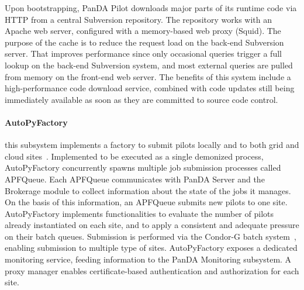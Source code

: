 
Upon bootstrapping, PanDA Pilot downloads major parts of its runtime code via
HTTP from a central Subversion repository. The repository works with an Apache
web server, configured with a memory-based web proxy (Squid). The purpose of the
cache is to reduce the request load on the back-end Subversion server. That
improves performance since only occasional queries trigger a full lookup on the
back-end Subversion system, and most external queries are pulled from memory on
the front-end web server. The benefits of this system include a high-performance
code download service, combined with code updates still being immediately
available as soon as they are committed to source code control.

\paragraph{\textbf{AutoPyFactory}} this subsystem implements a factory to submit
pilots locally and to both grid and cloud
sites~\cite{caballero2012autopyfactory}. Implemented to be executed as a single
demonized process, AutoPyFactory concurrently spawns multiple job submission
processes called APFQueue. Each APFQueue communicates with PanDA Server and the
Brokerage module to collect information about the state of the jobs it manages.
On the basis of this information, an APFQueue submits new pilots to one site.
AutoPyFactory implements functionalities to evaluate the number of pilots
already instantiated on each site, and to apply a consistent and adequate
pressure on their batch queues. Submission is performed via the Condor-G batch
system~\cite{frey2002condor}, enabling submission to multiple type of sites.
AutoPyFactory exposes a dedicated monitoring service, feeding information to the
PanDA Monitoring subsystem. A proxy manager enables certificate-based
authentication and authorization for each site.


